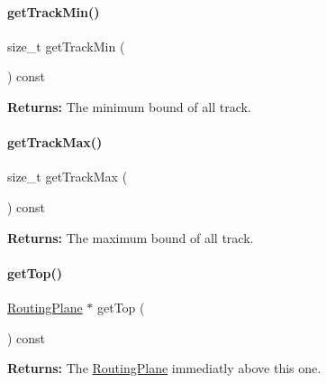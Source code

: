 \paragraph{\texorpdfstring{get\+Track\+Min()}{getTrackMin()}}
{\footnotesize\ttfamily size\+\_\+t get\+Track\+Min (\begin{DoxyParamCaption}{ }\end{DoxyParamCaption}) const\hspace{0.3cm}{\ttfamily [inline]}}

{\bfseries Returns\+:} The minimum bound of all track. \mbox{\label{classKite_1_1RoutingPlane_a5a0f37c5727c0d5bf286ed79b7143989}} 
\paragraph{\texorpdfstring{get\+Track\+Max()}{getTrackMax()}}
{\footnotesize\ttfamily size\+\_\+t get\+Track\+Max (\begin{DoxyParamCaption}{ }\end{DoxyParamCaption}) const\hspace{0.3cm}{\ttfamily [inline]}}

{\bfseries Returns\+:} The maximum bound of all track. \mbox{\label{classKite_1_1RoutingPlane_a855e69cd11c46df8c37843f25cabee05}} 
\paragraph{\texorpdfstring{get\+Top()}{getTop()}}
{\footnotesize\ttfamily \mbox{\hyperlink{classKite_1_1RoutingPlane}{Routing\+Plane}} $\ast$ get\+Top (\begin{DoxyParamCaption}{ }\end{DoxyParamCaption}) const}

{\bfseries Returns\+:} The \mbox{\hyperlink{classKite_1_1RoutingPlane}{Routing\+Plane}} immediatly above this one. \mbox{\label{classKite_1_1RoutingPlane_a7478ed4841ef25190c021165dd457520}} 
